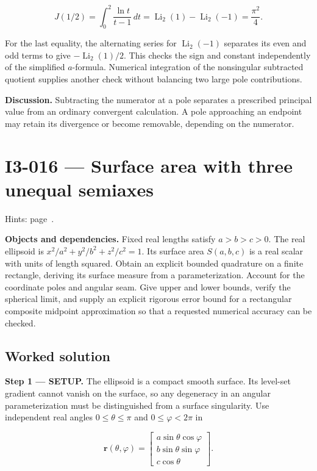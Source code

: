 \documentclass[11pt,oneside,openany]{book}
\begin{document}
\[
J(1/2)=\int_0^2\frac{\ln t}{t-1}\,dt
=\operatorname{Li}_2(1)-\operatorname{Li}_2(-1)
=\frac{\pi^2}{4}.
\]

For the last equality, the alternating series for \(\operatorname{Li}_2(-1)\) separates its even and odd terms to give \(-\operatorname{Li}_2(1)/2\). This checks the sign and constant independently of the simplified \(a\)-formula. Numerical integration of the nonsingular subtracted quotient supplies another check without balancing two large pole contributions.

\textbf{Discussion.} Subtracting the numerator at a pole separates a prescribed principal value from an ordinary convergent calculation. A pole approaching an endpoint may retain its divergence or become removable, depending on the numerator.
\clearpage
\section{I3-016 --- Surface area with three unequal semiaxes}
\label{problem:I3-016}
{\small Hints: page~\pageref{hints:I3-016}.}\par\medskip

\textbf{Objects and dependencies.} Fixed real lengths satisfy \(a>b>c>0\). The real ellipsoid is \(x^2/a^2+y^2/b^2+z^2/c^2=1\). Its surface area \(S(a,b,c)\) is a real scalar with units of length squared. Obtain an explicit bounded quadrature on a finite rectangle, deriving its surface measure from a parameterization. Account for the coordinate poles and angular seam. Give upper and lower bounds, verify the spherical limit, and supply an explicit rigorous error bound for a rectangular composite midpoint approximation so that a requested numerical accuracy can be checked.
\subsection*{Worked solution}

\textbf{Step 1 --- SETUP.} The ellipsoid is a compact smooth surface. Its level-set gradient cannot vanish on the surface, so any degeneracy in an angular parameterization must be distinguished from a surface singularity. Use independent real angles \(0\le\theta\le\pi\) and \(0\le\varphi<2\pi\) in

\[
\mathbf r(\theta,\varphi)=\begin{bmatrix}
a\sin\theta\cos\varphi\\b\sin\theta\sin\varphi\\c\cos\theta
\end{bmatrix}.
\]
\end{document}
